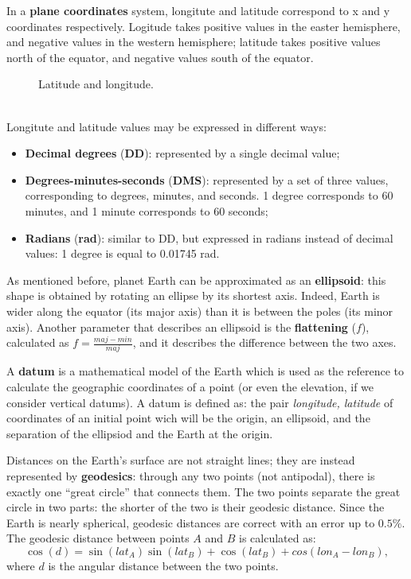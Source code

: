 In a \textbf{plane coordinates} system, longitute and latitude correspond to x and y coordinates respectively. Logitude takes positive values in the easter hemisphere, and negative values in the western hemisphere; latitude takes positive values north of the equator, and negative values south of the equator.
\begin{figure}[!ht]
    \centering
    
    \caption{Latitude and longitude.}
    \label{fig:lat-lon-earth}
\end{figure}
\\
Longitute and latitude values may be expressed in different ways:
\begin{itemize}
    \item \textbf{Decimal degrees} (\textbf{DD}): represented by a single decimal value;
    \item \textbf{Degrees-minutes-seconds} (\textbf{DMS}): represented by a set of three values, corresponding to degrees, minutes, and seconds. 1 degree corresponds to 60 minutes, and 1 minute corresponds to 60 seconds;
    \item \textbf{Radians} (\textbf{rad}): similar to DD, but expressed in radians instead of decimal values: 1 degree is equal to 0.01745 rad.
\end{itemize}

As mentioned before, planet Earth can be approximated as an \textbf{ellipsoid}: this shape is obtained by rotating an ellipse by its shortest axis. Indeed, Earth is wider along the equator (its major axis) than it is between the poles (its minor axis). Another parameter that describes an ellipsoid is the \textbf{flattening} ($f$), calculated as $f = \frac{maj - min}{maj}$, and it describes the difference between the two axes.

A \textbf{datum} is a mathematical model of the Earth which is used as the reference to calculate the geographic coordinates of a point (or even the elevation, if we consider vertical datums). A datum is defined as: the pair \textit{longitude, latitude} of coordinates of an initial point wich will be the origin, an ellipsoid, and the separation of the ellipsiod and the Earth at the origin.

Distances on the Earth's surface are not straight lines; they are instead represented by \textbf{geodesics}: through any two points (not antipodal), there is exactly one ``great circle'' that connects them. The two points separate the great circle in two parts: the shorter of the two is their geodesic distance. Since the Earth is nearly spherical, geodesic distances are correct with an error up to $0.5\%$. The geodesic distance between points $A$ and $B$ is calculated as:
\begin{equation*}
    \cos(d) = \sin(\textit{lat}_A) \sin(\textit{lat}_B) + \cos(\textit{lat}_B) + cos(\textit{lon}_A - \textit{lon}_B),
\end{equation*}
where $d$ is the angular distance between the two points.

